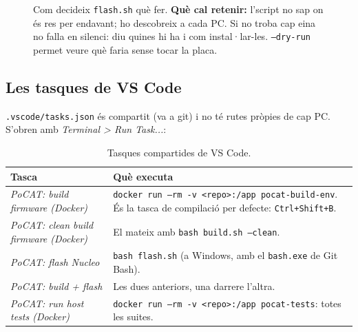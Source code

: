 \documentclass[11pt,a4paper]{article}
\DeclareRobustCommand{\_}{\textunderscore\allowbreak}
\newcommand{\cd}[1]{\texttt{#1}}
\newcommand{\fl}{\ensuremath{\rightarrow}}
\begin{document}
\begin{figure}[p]
\caption{Com decideix \cd{flash.sh} què fer. \textbf{Què cal retenir:} l'script no sap on és res per
endavant; ho descobreix a cada PC. Si no troba cap eina no falla en silenci: diu quines hi ha i com
instal·lar-les. \cd{--dry-run} permet veure què faria sense tocar la placa.}
\label{fig:flashsh}
\end{figure}

\subsection{Les tasques de VS Code}

\cd{.vscode/tasks.json} és compartit (va a git) i no té rutes pròpies de cap PC. S'obren
amb \emph{Terminal > Run Task...}:

\begin{table}[H]
\centering\small
\begin{tabularx}{\textwidth}{@{}>{\raggedright\arraybackslash}p{5.6cm}>{\raggedright\arraybackslash}X@{}}
\toprule
Tasca & Què executa\\
\midrule
\emph{PoCAT: build firmware (Docker)} & \cd{docker run --rm -v <repo>:/app pocat-build-env}. És la tasca de compilació per defecte: \cd{Ctrl+Shift+B}.\\
\emph{PoCAT: clean build firmware (Docker)} & El mateix amb \cd{bash build.sh --clean}.\\
\emph{PoCAT: flash Nucleo} & \cd{bash flash.sh} (a Windows, amb el \cd{bash.exe} de Git Bash).\\
\emph{PoCAT: build + flash} & Les dues anteriors, una darrere l'altra.\\
\emph{PoCAT: run host tests (Docker)} & \cd{docker run --rm -v <repo>:/app pocat-tests}: totes les suites.\\
\bottomrule
\end{tabularx}
\caption{Tasques compartides de VS Code.}
\end{table}
\end{document}
